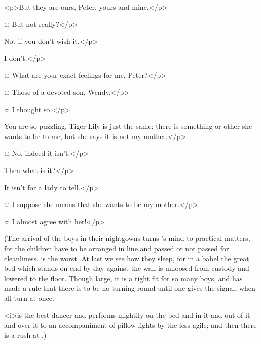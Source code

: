 \begin{drama}
<p>But they are ours, Peter, yours and mine.</p>

\peterspeaks {}¤
But not really?</p>

\wendyspeaks
Not if you don't wish it.</p>

\peterspeaks
I don't.</p>

\wendyspeaks {}¤
What are your exact feelings for me, Peter?</p>

\peterspeaks {}¤
Those of a devoted son, Wendy.</p>

\wendyspeaks {}¤
I thought so.</p>

\peterspeaks
You are so puzzling.
Tiger Lily is just the same; there is something or other she wants to be to me,
but she says it is not my mother.</p>

\wendyspeaks {}¤
No, indeed it isn't.</p>

\peterspeaks
Then what is it?</p>

\wendyspeaks
It isn't for a lady to tell.</p>


\peterspeaks {}¤
I suppose she means that she wants to be my mother.</p>


\wendyspeaks {}¤
I almost agree with her!</p>

\begin{stagedir}
(The arrival of the boys in their nightgowns turns \wendy's mind to practical matters,
for the children have to be arranged in line and passed or not passed for cleanliness.
\slightly is the worst.
At last we see how they sleep,
for in a babel the great bed which stands on end by day against the wall is unloosed from custody
and lowered to the floor.
Though large, it is a tight fit for so many boys,
and \wendy has made a rule that there is to be no turning round until one gives the signal, when all turn at once.

\firsttwin <i>is the best dancer and performs mightily on the bed and in it and out of it and over it
to an accompaniment of pillow fights by the less agile;
and then there is a rush at \wendy.)
\end{stagedir}


\end{drama}
